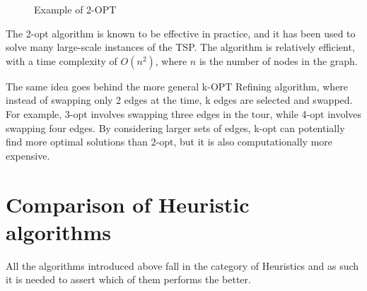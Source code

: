 \begin{figure}[!h]
    \centering
    \caption{Example of 2-OPT} \label{fig:2OPT}
\end{figure}



The 2-opt algorithm is known to be effective in practice, and it has been used to solve many large-scale instances of the TSP. The algorithm is relatively efficient, with a time complexity of $O(n^2)$, where $n$ is the number of nodes in the graph.

The same idea goes behind the more general k-OPT Refining algorithm, where instead of swapping only 2 edges at the time, k edges are selected and swapped. For example, 3-opt involves swapping three edges in the tour, while 4-opt involves swapping four edges. By considering larger sets of edges, k-opt can potentially find more optimal solutions than 2-opt, but it is also computationally more expensive.






\section{Comparison of Heuristic algorithms}
All the algorithms introduced above fall in the category of Heuristics and as such it is needed to assert which of them performs the better.

